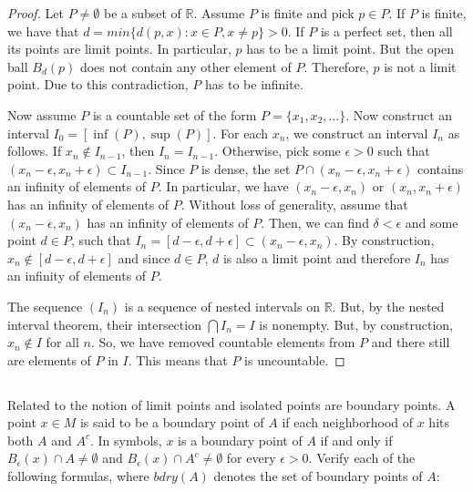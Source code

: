 \begin{proof}
Let $P \neq \emptyset$ be a subset of $\mathbb{R}$. Assume $P$ is finite and pick $p \in P$. If $P$ is finite, we have that $d = min\{d(p, x): x \in P, x \neq p\} > 0$. If $P$ is a perfect set, then all its points are limit points. In particular, $p$ has to be a limit point. But the open ball $B_d(p)$ does not contain any other element of $P$. Therefore, $p$ is not a limit point. Due to this contradiction, $P$ has to be infinite.

Now assume $P$ is a countable set of the form $P=\{x_1, x_2, \dots \}$. Now construct an interval $I_0 = [\inf(P), \sup(P)]$. For each $x_n$, we construct an interval $I_n$ as follows. If $x_n \notin I_{n-1}$, then $I_n = I_{n-1}$. Otherwise, pick some $\epsilon > 0$ such that $(x_n - \epsilon, x_n + \epsilon) \subset I_{n-1}$. Since $P$ is dense, the set $P \cap (x_n - \epsilon, x_n + \epsilon)$ contains an infinity of elements of $P$. In particular, we have $(x_n - \epsilon, x_n)$ or $(x_n, x_n+\epsilon)$ has an infinity of elements of $P$. Without loss of generality, assume that $(x_n - \epsilon, x_n)$ has an infinity of elements of $P$. Then, we can find $\delta < \epsilon$ and some point $d \in P$, such that $I_n = [d-\epsilon, d+\epsilon] \subset (x_n - \epsilon, x_n)$. By construction, $x_n \notin [d-\epsilon, d+\epsilon]$ and since $d\in P$, $d$ is also a limit point and therefore $I_n$ has an infinity of elements of $P$.


The sequence $(I_n)$ is a sequence of nested intervals on $\mathbb{R}$. But, by the nested interval theorem, their intersection $\bigcap I_n = I$ is nonempty. But, by construction, $x_n \notin I$ for all $n$. So, we have removed countable elements from $P$ and there still are elements of $P$ in $I$. This means that $P$ is uncountable.

\end{proof}

\subsection{} Related to the notion of limit points and isolated points are boundary points. A point $x \in M$ is said to be  a boundary point of $A$ if each neighborhood of $x$ hits both $A$ and $A^c$. In symbols, $x$ is a boundary point of $A$ if and only if $B_\epsilon (x) \cap A \neq \emptyset$ and $B_\epsilon(x) \cap A^c \neq \emptyset$ for every $\epsilon  > 0$. Verify each of the following formulas, where $bdry(A)$ denotes the set of boundary points of $A$: 

